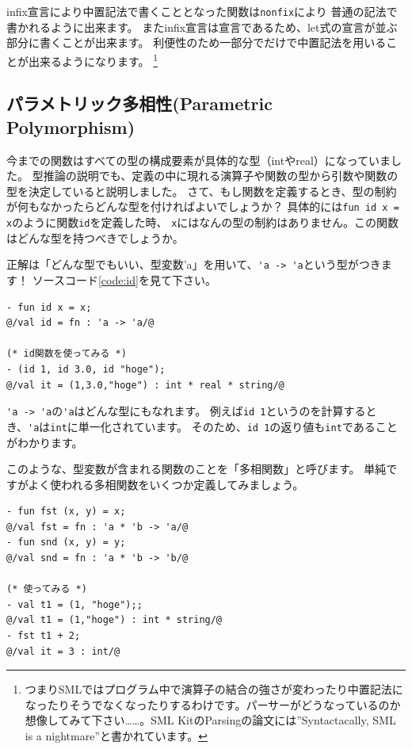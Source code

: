 \documentclass[11pt,a4paper]{article}
\begin{document}
infix宣言により中置記法で書くこととなった関数は\lstinline{nonfix}により
普通の記法で書かれるように出来ます。
またinfix宣言は宣言であるため、let式の宣言が並ぶ部分に書くことが出来ます。
利便性のため一部分でだけで中置記法を用いることが出来るようになります。
\footnote{つまりSMLではプログラム中で演算子の結合の強さが変わったり中置記法になったりそうでなくなったりするわけです。パーサーがどうなっているのか想像してみて下さい……。SML KitのParsingの論文には''Syntactacally, SML is a nightmare''\cite{SML-KIT}と書かれています。}

\subsection{パラメトリック多相性(Parametric Polymorphism)}

今までの関数はすべての型の構成要素が具体的な型（intやreal）になっていました。
型推論の説明でも、定義の中に現れる演算子や関数の型から引数や関数の型を決定していると説明しました。
さて、もし関数を定義するとき、型の制約が何もなかったらどんな型を付ければよいでしょうか？
具体的には\lstinline{fun id x = x}のように関数\lstinline{id}を定義した時、
\lstinline{x}にはなんの型の制約はありません。この関数はどんな型を持つべきでしょうか。

正解は「どんな型でもいい、型変数'a」を用いて、\lstinline{'a -> 'a}という型がつきます！
ソースコード\ref{code:id}を見て下さい。

\begin{lstlisting}[caption=多相関数,label=code:id]
- fun id x = x;
@/val id = fn : 'a -> 'a/@

(* id関数を使ってみる *)
- (id 1, id 3.0, id "hoge");
@/val it = (1,3.0,"hoge") : int * real * string/@
\end{lstlisting}

\lstinline{'a -> 'a}の\lstinline{'a}はどんな型にもなれます。
例えば\lstinline{id 1}というのを計算するとき、\lstinline{'a}は\lstinline{int}に単一化されています。
そのため、\lstinline{id 1}の返り値も\lstinline{int}であることがわかります。

このような、型変数が含まれる関数のことを「多相関数」と呼びます。
単純ですがよく使われる多相関数をいくつか定義してみましょう。

\begin{lstlisting}[caption=多相関数たち,label=code:poly]
- fun fst (x, y) = x;
@/val fst = fn : 'a * 'b -> 'a/@
- fun snd (x, y) = y;
@/val snd = fn : 'a * 'b -> 'b/@

(* 使ってみる *)
- val t1 = (1, "hoge");;
@/val t1 = (1,"hoge") : int * string/@
- fst t1 + 2;
@/val it = 3 : int/@
\end{lstlisting}
\end{document}
